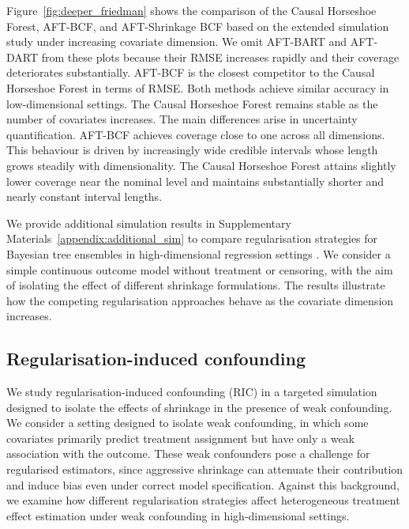



Figure~\ref{fig:deeper_friedman} shows the comparison of the Causal Horseshoe Forest, AFT-BCF, and AFT-Shrinkage BCF based on the extended simulation study under increasing covariate dimension. 
We omit AFT-BART and AFT-DART from these plots because their RMSE increases rapidly and their coverage deteriorates substantially. 
AFT-BCF is the closest competitor to the Causal Horseshoe Forest in terms of RMSE. 
Both methods achieve similar accuracy in low-dimensional settings. 
The Causal Horseshoe Forest remains stable as the number of covariates increases. 
The main differences arise in uncertainty quantification. 
AFT-BCF achieves coverage close to one across all dimensions. 
This behaviour is driven by increasingly wide credible intervals whose length grows steadily with dimensionality. 
The Causal Horseshoe Forest attains slightly lower coverage near the nominal level and maintains substantially shorter and nearly constant interval lengths.




We provide additional simulation results in Supplementary Materials~\ref{appendix:additional_sim} to compare regularisation strategies for Bayesian tree ensembles in high-dimensional regression settings \citep{supplement}.
We consider a simple continuous outcome model without treatment or censoring, with the aim of isolating the effect of different shrinkage formulations. 
The results illustrate how the competing regularisation approaches behave as the covariate dimension increases.


\subsection{Regularisation-induced confounding}\label{sec:sim_ric}

We study regularisation-induced confounding (RIC) in a targeted simulation designed to isolate the effects of shrinkage in the presence of weak confounding. 
We consider a setting designed to isolate weak confounding, in which some covariates primarily predict treatment assignment but have only a weak association with the outcome.
These weak confounders pose a challenge for regularised estimators, since aggressive shrinkage can attenuate their contribution and induce bias even under correct model specification. 
Against this background, we examine how different regularisation strategies affect heterogeneous treatment effect estimation under weak confounding in high-dimensional settings.

